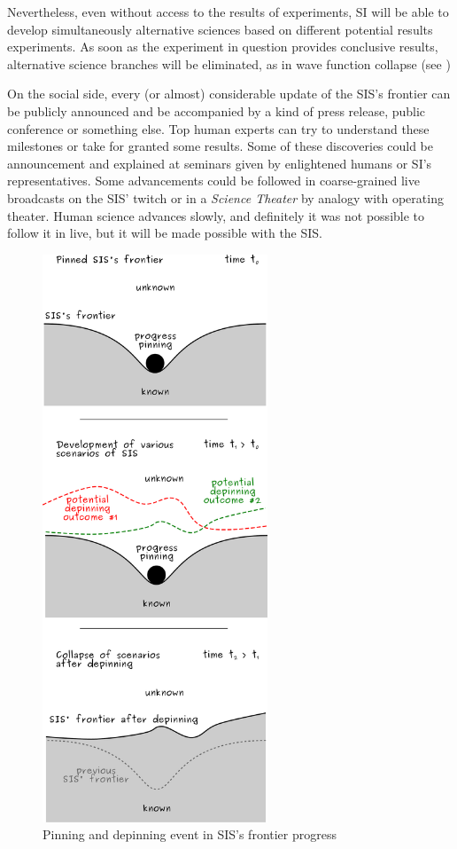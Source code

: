 \documentclass[a4paper,11pt]{article}
\begin{document}
Nevertheless, even without access to the results of experiments, SI will be able to develop simultaneously alternative sciences based on different potential results experiments. As soon as the experiment in question provides conclusive results, alternative science branches will be eliminated, as in wave function collapse (see )

On the social side, every (or almost) considerable update of the SIS's frontier can be publicly announced and be accompanied by a kind of press release, public conference or something else. Top human experts can try to understand these milestones or take for granted some results. Some of these discoveries could be announcement and explained at seminars given by enlightened humans or SI's representatives. Some advancements could be followed in coarse-grained live broadcasts on the SIS' twitch or in a \emph{Science Theater} by analogy with operating theater. Human science advances slowly, and definitely it was not possible to follow it in live, but it will be made possible with the SIS.

\begin{figure}[ht!]
    \centering\includegraphics[width=0.6\textwidth]{depinning_2.pdf}
    \caption{\label{fig:pinning}Pinning and depinning event in SIS's frontier progress}
\end{figure}
\end{document}
